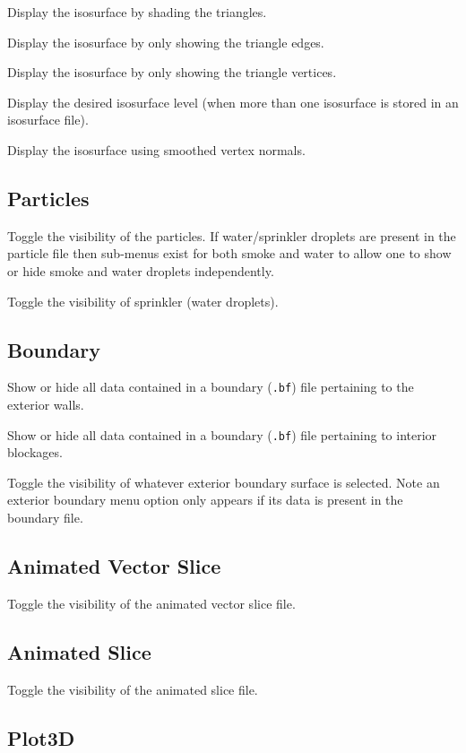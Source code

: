 \documentclass[11pt,twoside]{book}
\newcommand{\parma}{.75}
\newcommand{\parmb}{.5}
\newcommand{\parmc}{0.25}
\newcommand{\blist}{
\begin{list}
{}{
\setlength{\leftmargin}{\parma in}
\setlength{\labelwidth}{\parmb in}
\setlength{\labelsep}{\parmc in}
\setlength{\listparindent}{0.3in}
\setlength{\topsep}{.3in}
\setlength{\parsep}{.0in}
}}
\newcommand{\elist}{\end{list}}
\newcommand{\hitem}[1]{\item[{\bf #1} \hfill]}
\begin{document}
\blist
\hitem{Solid}Display the isosurface by shading
the triangles.

\hitem{Outline}Display the isosurface by only
showing the triangle edges.

\hitem{Points}Display the isosurface
by only showing the triangle vertices.

\hitem{{\em quantity}\ levels}
Display the desired isosurface level (when more than one
isosurface is stored in an isosurface file).

\hitem{Smooth}Display
the isosurface using smoothed vertex normals.

\elist

\subsection{Particles}
\blist

\hitem{Smoke (tracer)}Toggle the visibility of the
particles. If water/sprinkler droplets are present in the
particle file then sub-menus exist for both smoke and water
to allow one to show or hide smoke and water droplets
independently.

\hitem{Sprinkler}Toggle the visibility of sprinkler (water
droplets). \elist
\subsection{Boundary}
\blist

\hitem{Exterior}Show or hide all data contained in a
boundary ({\tt .bf}) file pertaining to the exterior walls.

\hitem{Interior}Show or hide all data contained in a
boundary ({\tt .bf}) file pertaining to interior blockages.

\hitem{Front, Back, Left, Right, Up, Down}Toggle the
visibility of whatever exterior boundary surface is
selected.  Note an exterior boundary menu option only
appears if its data is present in the boundary file. \elist

\subsection{Animated Vector Slice}
Toggle the visibility of the animated vector slice file.
\subsection{Animated Slice}
Toggle the visibility of the animated slice file.
\subsection{Plot3D}
\end{document}
